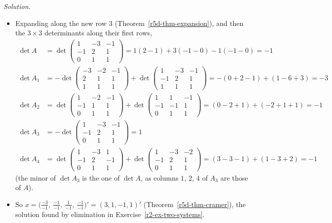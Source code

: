 \documentclass[12pt]{article}
\theoremstyle{definition}
\newenvironment{solution}{\par\noindent\textit{Solution.}\ }{\par\smallskip}
\begin{document}
\begin{solution}
\begin{itemize}
\[\begin{gathered}
\end{gathered}
\]
\item Expanding along the new row \(3\) (Theorem~\ref{r5d-thm-expansion}), and then the \(3\times3\) determinants along
their first rows,
\[
\begin{aligned}
\det A&=\det\begin{pmatrix}1&-3&-1\\-1&2&1\\0&1&1\end{pmatrix}=1(2-1)+3(-1-0)-1(-1-0)=-1\\
\det A_1&=-\det\begin{pmatrix}-3&-2&-1\\2&1&1\\1&1&1\end{pmatrix}+\det\begin{pmatrix}1&-3&-1\\-1&2&1\\1&1&1\end{pmatrix}
=-(0+2-1)+(1-6+3)=-3\\
\det A_2&=\det\begin{pmatrix}1&-2&-1\\-1&1&1\\0&1&1\end{pmatrix}+\det\begin{pmatrix}1&1&-1\\-1&-1&1\\0&1&1\end{pmatrix}
=(0-2+1)+(-2+1+1)=-1\\
\det A_3&=-\det\begin{pmatrix}1&-3&-1\\-1&2&1\\0&1&1\end{pmatrix}=1\\
\det A_4&=\det\begin{pmatrix}1&-3&1\\-1&2&-1\\0&1&1\end{pmatrix}+\det\begin{pmatrix}1&-3&-2\\-1&2&1\\0&1&1\end{pmatrix}
=(3-3-1)+(1-3+2)=-1
\end{aligned}
\]
(the minor of \(\det A_3\) is the one of \(\det A\), as columns \(1\), \(2\), \(4\) of \(A_3\) are those of \(A\)).
\item So \(x=\bigl(\frac{-3}{-1},\ \frac{-1}{-1},\ \frac1{-1},\ \frac{-1}{-1}\bigr)'=(3,1,-1,1)'\)
(Theorem~\ref{r5d-thm-cramer}), the solution found by elimination in Exercise~\ref{r2-ex-two-systems}.
\end{itemize}
\end{solution}
\end{document}
